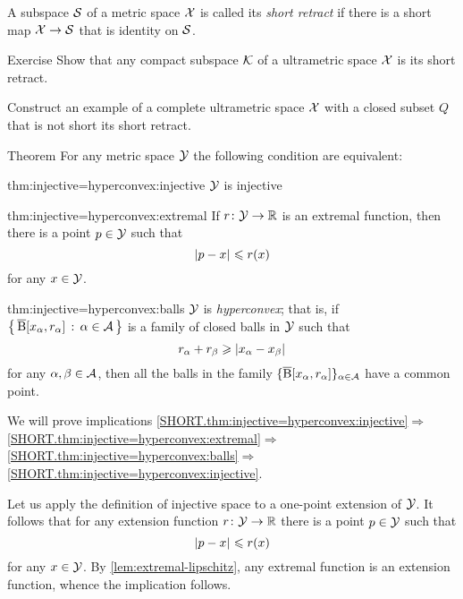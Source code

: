 A subspace $\mathcal{S}$ of a metric space $\mathcal{X}$ is called its \emph{short retract} if there is a short map $\mathcal{X}\to \mathcal{S}$ that is identity on $\mathcal{S}$.

\begin{thm}{Exercise}\label{ex:ultrametric-converse}
Show that any compact subspace $\mathcal{K}$ of a ultrametric space $\mathcal{X}$ is its short retract.

Construct an example of a complete ultrametric space $\mathcal{X}$ with a closed subset $Q$ that is not short its short retract.
\end{thm}


\begin{thm}{Theorem}\label{thm:injective=hyperconvex}
For any metric space $\mathcal{Y}$ the following condition are equivalent:

\begin{subthm}{thm:injective=hyperconvex:injective}
$\mathcal{Y}$ is injective
\end{subthm}


\begin{subthm}{thm:injective=hyperconvex:extremal}
If $r\colon\mathcal{Y}\to\mathbb{R}$ is an extremal function, then there is a point $p\in \mathcal{Y}$ such that 
\[\dist{p}{x}{}\le r(x)\]
for any $x\in \mathcal{Y}$.
\end{subthm}

\begin{subthm}{thm:injective=hyperconvex:balls}
$\mathcal{Y}$ is \emph{hyperconvex};
that is, if $\left\{\,{\overline{\mathrm{B}}{}[x_\alpha,r_\alpha]}\,:\,{\alpha\in\mathcal{A}}\,\right\}$ is a family of closed balls in $\mathcal{Y}$ such that 
 \[r_\alpha+r_\beta\ge \dist{x_\alpha}{x_\beta}{}\]
 for any $\alpha,\beta\in \mathcal{A}$, then all the balls in the family $\{\overline{\mathrm{B}}{}[x_\alpha,r_\alpha]\}_{\alpha\in\mathcal{A}}$ have a common point.
\end{subthm}

\end{thm}

 We will prove implications 
\ref{SHORT.thm:injective=hyperconvex:injective}$\Rightarrow$\ref{SHORT.thm:injective=hyperconvex:extremal}$\Rightarrow$\ref{SHORT.thm:injective=hyperconvex:balls}$\Rightarrow$\ref{SHORT.thm:injective=hyperconvex:injective}.

Let us apply the definition of injective space to a one-point extension of $\mathcal{Y}$.
It follows that for any extension function $r\colon\mathcal{Y}\to\mathbb{R}$ there is a point $p\in \mathcal{Y}$ such that 
\[\dist{p}{x}{}\le r(x)\]
for any $x\in \mathcal{Y}$.
By \ref{lem:extremal-lipschitz}, any extremal function is an extension function, whence the implication follows.

